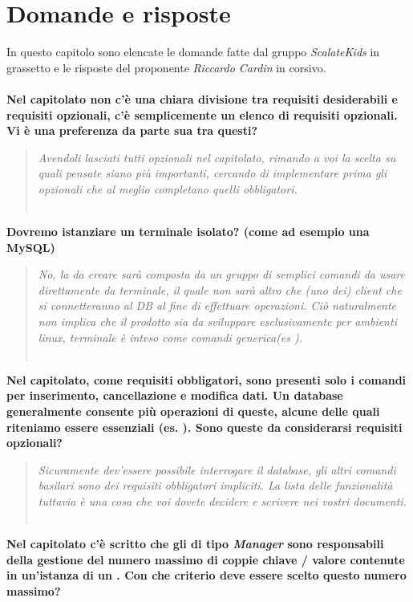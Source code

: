 \documentclass{scalatekids-article}
\begin{document}
\section{Domande e risposte}
In questo capitolo sono elencate le domande fatte dal gruppo \textit{ScalateKids} in grassetto e le risposte del proponente \textit{Riccardo Cardin} in corsivo.
\textbf{\\ \\Nel capitolato non c'è una chiara divisione tra requisiti desiderabili e requisiti opzionali, c'è semplicemente un elenco di requisiti opzionali. Vi è una preferenza da parte sua tra questi?}
\begin{quote}
  \textit{Avendoli lasciati tutti opzionali nel capitolato, rimando a voi la
    scelta su quali pensate siano più importanti, cercando di implementare prima
    gli opzionali che al meglio completano quelli obbligatori.\\ \\}
\end{quote}
\textbf{Dovremo istanziare un terminale isolato? (come ad esempio una  MySQL)}
\begin{quote}
  \textit{No, la  da creare sarà composta da un gruppo di semplici
    comandi da usare direttamente da terminale, il quale non sarà altro che (uno
    dei) client che si connetteranno al DB al fine di effettuare operazioni. Ciò
    naturalmente non implica che il prodotto sia da sviluppare esclusivamente
    per ambienti linux, terminale è inteso come  comandi generica(es
    ).\\ \\}
\end{quote}
\textbf{Nel capitolato, come requisiti obbligatori, sono presenti solo i comandi per inserimento, cancellazione e modifica dati. Un database generalmente consente più operazioni di queste, alcune delle quali riteniamo essere essenziali (es. ). Sono queste da considerarsi requisiti opzionali?}
\begin{quote}
  \textit{Sicuramente dev'essere possibile interrogare il database, gli altri comandi basilari sono dei requisiti obbligatori impliciti. La lista delle funzionalità tuttavia è una cosa che voi dovete decidere e scrivere nei vostri documenti.\\ \\}
\end{quote}
\textbf{Nel capitolato c'è scritto che gli  di tipo \textit{Manager} sono responsabili della gestione del numero massimo di coppie chiave / valore contenute in un’istanza di un . Con che criterio deve essere scelto questo numero massimo?}
\end{document}
